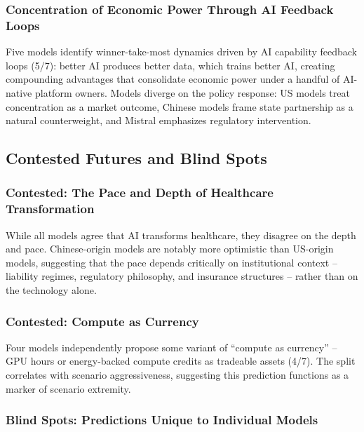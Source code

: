 \documentclass[preprint,review,12pt]{elsarticle}
\begin{document}
\subsubsection{Concentration of Economic Power Through AI Feedback Loops}
\label{sec:concentration}

Five models identify winner-take-most dynamics driven by AI capability feedback loops (5/7): better AI produces better data, which trains better AI, creating compounding advantages that consolidate economic power under a handful of AI-native platform owners. Models diverge on the policy response: US models treat concentration as a market outcome, Chinese models frame state partnership as a natural counterweight, and Mistral emphasizes regulatory intervention.


\subsection{Contested Futures and Blind Spots}
\label{sec:contested_futures}


\subsubsection{Contested: The Pace and Depth of Healthcare Transformation}
\label{sec:healthcare_contested}

While all models agree that AI transforms healthcare, they disagree on the depth and pace. Chinese-origin models are notably more optimistic than US-origin models, suggesting that the pace depends critically on institutional context -- liability regimes, regulatory philosophy, and insurance structures -- rather than on the technology alone.


\subsubsection{Contested: Compute as Currency}
\label{sec:compute_currency}

Four models independently propose some variant of ``compute as currency'' -- GPU hours or energy-backed compute credits as tradeable assets (4/7). The split correlates with scenario aggressiveness, suggesting this prediction functions as a marker of scenario extremity.


\subsubsection{Blind Spots: Predictions Unique to Individual Models}
\label{sec:blind_spots}
\end{document}
